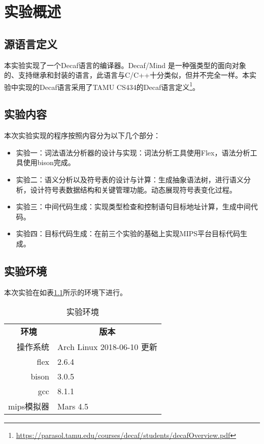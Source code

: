 \chapter{实验概述}
\label{cha:shi_yan_gai_shu_}

\section{源语言定义}
\label{sec:yuan_yu_yan_ding_yi_}

\par 本实验实现了一个Decaf语言的编译器。Decaf/Mind 是一种强类型的面向对象的、支持继承和封装的语言，此语言与C/C++十分类似，但并不完全一样。本实验中实现的Decaf语言采用了TAMU CS434的Decaf语言定义\footnote{\url{https://parasol.tamu.edu/courses/decaf/students/decafOverview.pdf}}。

\section{实验内容}
\label{sec:shi_yan_nei_rong_}

\par 本次实验实现的程序按照内容分为以下几个部分：
\begin{itemize}
    \item 实验一：词法语法分析器的设计与实现：词法分析工具使用Flex，语法分析工具使用bison完成。
    \item 实验二：语义分析以及符号表的设计与计算：生成抽象语法树，进行语义分析，设计符号表数据结构和关键管理功能。动态展现符号表变化过程。
    \item 实验三：中间代码生成：实现类型检查和控制语句目标地址计算，生成中间代码。
    \item 实验四：目标代码生成：在前三个实验的基础上实现MIPS平台目标代码生成。
\end{itemize}

\section{实验环境}
\label{sec:shi_yan_huan_jing_}

\par 本次实验在如表\ref{tab:environment}所示的环境下进行。
\begin{table}[htbp]
    \centering
    \caption{实验环境}
    \label{tab:environment}
    \begin{tabular}{r l}
        \toprule
        \multicolumn{1}{c}{\textbf{环境}} &
        \multicolumn{1}{c}{\textbf{版本}} \\
        \cmidrule(lr){1-1} \cmidrule(lr){2-2}
        操作系统    & Arch Linux 2018-06-10 更新\\
        flex        & 2.6.4 \\
        bison       & 3.0.5 \\
        gcc         & 8.1.1 \\
        mips模拟器  & Mars 4.5 \\
        \bottomrule
    \end{tabular}
\end{table}

